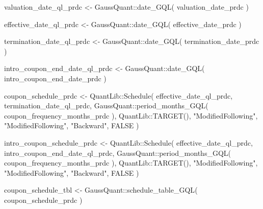 \documentclass[
  letterpaper,
  DIV=11,
  numbers=noendperiod]{scrreprt}
\newenvironment{Shaded}{\begin{snugshade}}{\end{snugshade}}
\newcommand{\ConstantTok}[1]{\textcolor[rgb]{0.56,0.35,0.01}{#1}}
\newcommand{\FunctionTok}[1]{\textcolor[rgb]{0.28,0.35,0.67}{#1}}
\newcommand{\NormalTok}[1]{\textcolor[rgb]{0.00,0.23,0.31}{#1}}
\newcommand{\OtherTok}[1]{\textcolor[rgb]{0.00,0.23,0.31}{#1}}
\newcommand{\SpecialCharTok}[1]{\textcolor[rgb]{0.37,0.37,0.37}{#1}}
\newcommand{\StringTok}[1]{\textcolor[rgb]{0.13,0.47,0.30}{#1}}
\begin{document}
\begin{Shaded}
\begin{Highlighting}[]
\NormalTok{valuation\_date\_ql\_prdc }\OtherTok{\textless{}{-}}\NormalTok{ GaussQuant}\SpecialCharTok{::}\FunctionTok{date\_GQL}\NormalTok{(}
\NormalTok{  valuation\_date\_prdc}
\NormalTok{)}

\NormalTok{effective\_date\_ql\_prdc }\OtherTok{\textless{}{-}}\NormalTok{ GaussQuant}\SpecialCharTok{::}\FunctionTok{date\_GQL}\NormalTok{(}
\NormalTok{  effective\_date\_prdc}
\NormalTok{)}

\NormalTok{termination\_date\_ql\_prdc }\OtherTok{\textless{}{-}}\NormalTok{ GaussQuant}\SpecialCharTok{::}\FunctionTok{date\_GQL}\NormalTok{(}
\NormalTok{  termination\_date\_prdc}
\NormalTok{)}

\NormalTok{intro\_coupon\_end\_date\_ql\_prdc }\OtherTok{\textless{}{-}}\NormalTok{ GaussQuant}\SpecialCharTok{::}\FunctionTok{date\_GQL}\NormalTok{(}
\NormalTok{  intro\_coupon\_end\_date\_prdc}
\NormalTok{)}

\NormalTok{coupon\_schedule\_prdc }\OtherTok{\textless{}{-}}\NormalTok{ QuantLib}\SpecialCharTok{::}\FunctionTok{Schedule}\NormalTok{(}
\NormalTok{  effective\_date\_ql\_prdc,}
\NormalTok{  termination\_date\_ql\_prdc,}
\NormalTok{  GaussQuant}\SpecialCharTok{::}\FunctionTok{period\_months\_GQL}\NormalTok{(}
\NormalTok{    coupon\_frequency\_months\_prdc}
\NormalTok{  ),}
\NormalTok{  QuantLib}\SpecialCharTok{::}\FunctionTok{TARGET}\NormalTok{(),}
  \StringTok{"ModifiedFollowing"}\NormalTok{,}
  \StringTok{"ModifiedFollowing"}\NormalTok{,}
  \StringTok{"Backward"}\NormalTok{,}
  \ConstantTok{FALSE}
\NormalTok{)}

\NormalTok{intro\_coupon\_schedule\_prdc }\OtherTok{\textless{}{-}}\NormalTok{ QuantLib}\SpecialCharTok{::}\FunctionTok{Schedule}\NormalTok{(}
\NormalTok{  effective\_date\_ql\_prdc,}
\NormalTok{  intro\_coupon\_end\_date\_ql\_prdc,}
\NormalTok{  GaussQuant}\SpecialCharTok{::}\FunctionTok{period\_months\_GQL}\NormalTok{(}
\NormalTok{    coupon\_frequency\_months\_prdc}
\NormalTok{  ),}
\NormalTok{  QuantLib}\SpecialCharTok{::}\FunctionTok{TARGET}\NormalTok{(),}
  \StringTok{"ModifiedFollowing"}\NormalTok{,}
  \StringTok{"ModifiedFollowing"}\NormalTok{,}
  \StringTok{"Backward"}\NormalTok{,}
  \ConstantTok{FALSE}
\NormalTok{)}

\NormalTok{coupon\_schedule\_tbl }\OtherTok{\textless{}{-}}\NormalTok{ GaussQuant}\SpecialCharTok{::}\FunctionTok{schedule\_table\_GQL}\NormalTok{(}
\NormalTok{  coupon\_schedule\_prdc}
\NormalTok{)}


\end{Highlighting}
\end{Shaded}
\end{document}
